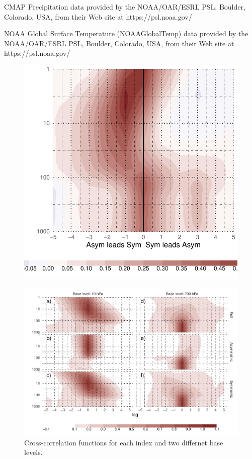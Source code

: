 \documentclass[]{ametsocV5}
\begin{document}
\acknowledgments

CMAP Precipitation data provided by the NOAA/OAR/ESRL PSL, Boulder,
Colorado, USA, from their Web site at https://psl.noaa.gov/

NOAA Global Surface Temperature (NOAAGlobalTemp) data provided by the
NOAA/OAR/ESRL PSL, Boulder, Colorado, USA, from their Web site at
https://psl.noaa.gov/



\newpage

\appendix


\begin{figure}
\includegraphics{A1-1} \label{fig:A1}
\end{figure}

\begin{figure}
\includegraphics{ccf-levels-1} \caption[Cross-correlation functions for each index and two differnet base levels]{Cross-correlation functions for each index and two differnet base levels.}\label{fig:ccf-levels}
\end{figure}
\end{document}
